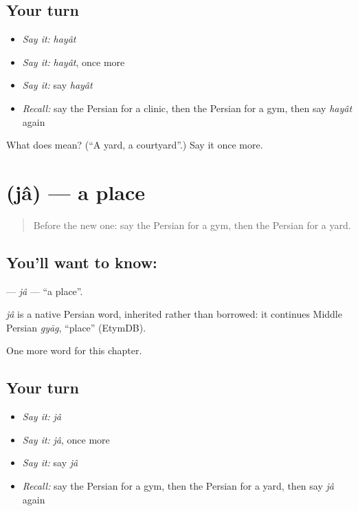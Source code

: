 \subsection*{Your turn}
\begin{itemize}
\raggedright
  \item \emph{Say it:} \emph{hayât}
  \item \emph{Say it:} \emph{hayât}, once more
  \item \emph{Say it:} say \emph{hayât}
  \item \emph{Recall:} say the Persian for a clinic, then the Persian for a gym, then say \emph{hayât} again
\end{itemize}

\begin{tcolorbox}[breakable,colback=teal!4,colframe=teal!35!black,title={Before you move on}]
What does  mean? (\textquotedblleft{}A yard, a courtyard\textquotedblright{}.) Say it once more.
\end{tcolorbox}
\section[\texorpdfstring{\fa{جا} (jâ)}{جا (jâ)}]{ (jâ) — a place}

\label{lesson:FA-C193-ja}



\begin{quote}
Before the new one: say the Persian for a gym, then the Persian for a yard.
\end{quote}

\subsection*{You'll want to know: }
\textbf{} — \emph{jâ} — \textquotedblleft{}a place\textquotedblright{}.

\begin{cousinweb}
\emph{jâ} is a native Persian word, inherited rather than borrowed: it continues Middle Persian \emph{gyāg}, \textquotedblleft{}place\textquotedblright{} (EtymDB).
\end{cousinweb}

\begin{grammarlens}[title={What you've built}]
One more word for this chapter.
\end{grammarlens}

\subsection*{Your turn}
\begin{itemize}
\raggedright
  \item \emph{Say it:} \emph{jâ}
  \item \emph{Say it:} \emph{jâ}, once more
  \item \emph{Say it:} say \emph{jâ}
  \item \emph{Recall:} say the Persian for a gym, then the Persian for a yard, then say \emph{jâ} again
\end{itemize}

